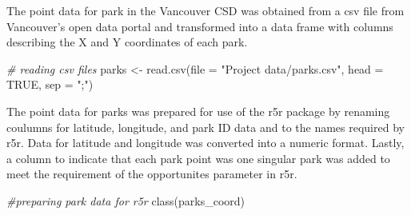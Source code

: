 \documentclass[
]{article}
\newenvironment{Shaded}{\begin{snugshade}}{\end{snugshade}}
\newcommand{\AttributeTok}[1]{\textcolor[rgb]{0.77,0.63,0.00}{#1}}
\newcommand{\CommentTok}[1]{\textcolor[rgb]{0.56,0.35,0.01}{\textit{#1}}}
\newcommand{\ConstantTok}[1]{\textcolor[rgb]{0.00,0.00,0.00}{#1}}
\newcommand{\FunctionTok}[1]{\textcolor[rgb]{0.00,0.00,0.00}{#1}}
\newcommand{\NormalTok}[1]{#1}
\newcommand{\OtherTok}[1]{\textcolor[rgb]{0.56,0.35,0.01}{#1}}
\newcommand{\SpecialCharTok}[1]{\textcolor[rgb]{0.00,0.00,0.00}{#1}}
\newcommand{\StringTok}[1]{\textcolor[rgb]{0.31,0.60,0.02}{#1}}
\begin{document}
The point data for park in the Vancouver CSD was obtained from a csv
file from Vancouver's open data portal and transformed into a data frame
with columns describing the X and Y coordinates of each park.

\begin{Shaded}
\begin{Highlighting}[]
\CommentTok{\# reading csv files}
\NormalTok{parks }\OtherTok{\textless{}{-}} \FunctionTok{read.csv}\NormalTok{(}\AttributeTok{file =} \StringTok{"Project data/parks.csv"}\NormalTok{, }\AttributeTok{head =} \ConstantTok{TRUE}\NormalTok{, }\AttributeTok{sep =} \StringTok{";"}\NormalTok{) }
\end{Highlighting}
\end{Shaded}

\begin{Shaded}
\end{Shaded}

The point data for parks was prepared for use of the r5r package by
renaming coulumns for latitude, longitude, and park ID data and to the
names required by r5r. Data for latitude and longitude was converted
into a numeric format. Lastly, a column to indicate that each park point
was one singular park was added to meet the requirement of the
opportunites parameter in r5r.

\begin{Shaded}
\begin{Highlighting}[]
\CommentTok{\#preparing park data for r5r}
\FunctionTok{class}\NormalTok{(parks\_coord)}
\end{Highlighting}
\end{Shaded}
\end{document}
